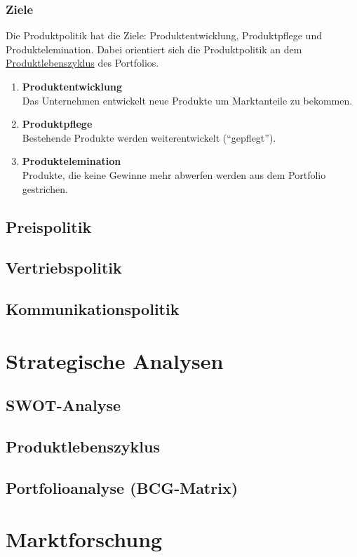 \subsubsection{Ziele}
\begin{flushleft}
    Die Produktpolitik hat die Ziele: Produktentwicklung, Produktpflege und Produktelemination.
    Dabei orientiert sich die Produktpolitik an dem \hyperref[subsec:Produktlebenszyklus]{Produktlebenszyklus}
    des Portfolios.
    \pagebreak
    \begin{enumerate}
        \item {
            \textbf{Produktentwicklung} \\
            Das Unternehmen entwickelt neue Produkte um Marktanteile zu bekommen.
        }
        \item {
            \textbf{Produktpflege} \\
            Bestehende Produkte werden weiterentwickelt (``gepflegt'').
        }
        \item {
            \textbf{Produktelemination} \\
            Produkte, die keine Gewinne mehr abwerfen werden aus dem Portfolio gestrichen.
        }
    \end{enumerate}
\end{flushleft}

\subsection{Preispolitik}
\subsection{Vertriebspolitik}
\subsection{Kommunikationspolitik}

\section{Strategische Analysen}
\subsection{SWOT-Analyse}
\subsection{Produktlebenszyklus}\label{subsec:Produktlebenszyklus}

\subsection{Portfolioanalyse (BCG-Matrix)}

\section{Marktforschung}